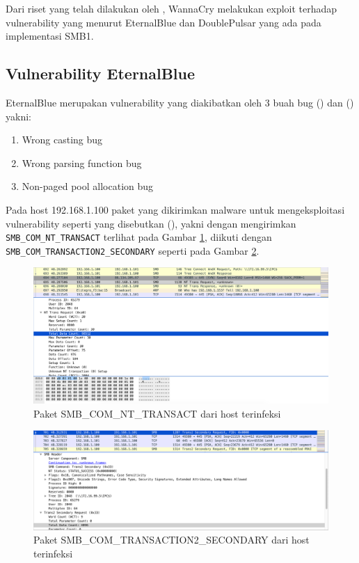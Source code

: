 Dari riset yang telah dilakukan oleh \cite{islam2018smb}, WannaCry melakukan exploit terhadap vulnerability yang menurut EternalBlue dan DoublePulsar yang ada pada implementasi SMB1.

\subsection{Vulnerability EternalBlue}
EternalBlue merupakan vulnerability yang diakibatkan oleh 3 buah bug (\cite{islam2018smb}) dan (\cite{grossman2017check}) yakni:
\begin{enumerate}
	\item Wrong casting bug
	\item Wrong parsing function bug
	\item Non-paged pool allocation bug
\end{enumerate}

Pada host 192.168.1.100 paket yang dikirimkan malware untuk mengeksploitasi vulnerability seperti yang disebutkan (\cite{islam2018smb}), yakni dengan mengirimkan \verb|SMB_COM_NT_TRANSACT| terlihat pada Gambar \ref{fig:trans_nop}, diikuti dengan \verb|SMB_COM_TRANSACTION2_SECONDARY| seperti pada Gambar \ref{fig:trans2_secondary}.

\begin{figure}[H]
	\centering
	\includegraphics[width=\textwidth]{resources/trans_nop.png}
	\caption{Paket SMB\_COM\_NT\_TRANSACT dari host terinfeksi}
	\label{fig:trans_nop}
\end{figure}
\begin{figure}[H]
	\centering
	\includegraphics[width=\textwidth]{resources/trans2_secondary.png}
	\caption{Paket SMB\_COM\_TRANSACTION2\_SECONDARY dari host terinfeksi}
	\label{fig:trans2_secondary}
\end{figure}

